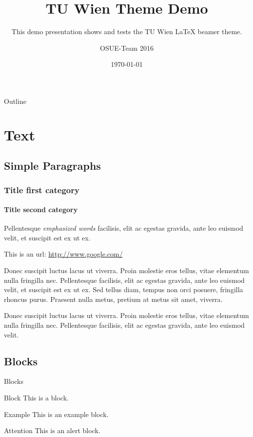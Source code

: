 \documentclass{beamer}
\title[TUW Theme Demo]{%
  TU Wien Theme Demo
}
\subtitle{This demo presentation shows and tests the TU Wien LaTeX beamer theme.}
\author{OSUE-Team 2016}
\date{\today}
\institute[TU Wien]
{%
  Department of Computer Engineering\\
  Technische Universität Wien\\
  ---\\
  182.709 Operating Systems UE\\
  WS 2016/17
}
\begin{document}
\begin{frame}
  \titlepage
\end{frame}

\begin{frame}{Outline}
  \tableofcontents
\end{frame}

\section{Text}

\subsection[Paragraphs]{Simple Paragraphs}
\begin{frame}
  \frametitle{Title first category}
  \framesubtitle{Title second category}

  Pellentesque \emph{emphasized words} facilisis, elit ac egestas gravida, ante
  leo euismod velit, et suscipit est ex ut ex.

  This is an url: \url{http://www.google.com/}

  Donec suscipit luctus lacus ut viverra. Proin molestie eros tellus, vitae
  elementum nulla fringilla nec. Pellentesque facilisis, elit ac egestas
  gravida, ante leo euismod velit, et suscipit est ex ut ex. Sed tellus diam,
  tempus non orci posuere, fringilla rhoncus purus. Praesent nulla metus,
  pretium at metus sit amet, viverra.

  Donec suscipit luctus lacus ut viverra. Proin molestie eros tellus, vitae
  elementum nulla fringilla nec. Pellentesque facilisis, elit ac egestas
  gravida, ante leo euismod velit.
\end{frame}

\subsection{Blocks}
\begin{frame}{Blocks}
  \begin{block}{Block}
    This is a block.
  \end{block}
  \begin{exampleblock}{Example}
    This is an example block.
  \end{exampleblock}
  \begin{alertblock}{Attention}
    This is an alert block.
  \end{alertblock}
\end{frame}
\end{document}
